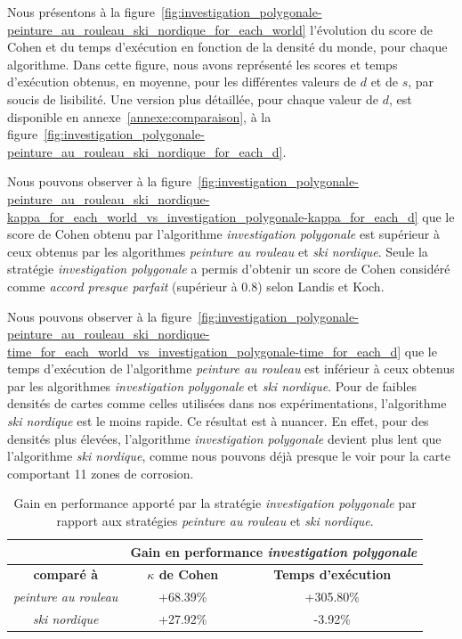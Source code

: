 \documentclass[francais,RandD]{rapportPFE}
\begin{document}
			Nous présentons à la figure~\ref{fig:investigation_polygonale-peinture_au_rouleau_ski_nordique_for_each_world} l'évolution du score de Cohen et du temps d'exécution en fonction de la densité du monde, pour chaque algorithme.
			Dans cette figure, nous avons représenté les scores et temps d'exécution obtenus, en moyenne, pour les différentes valeurs de $d$ et de $s$, par soucis de lisibilité.
			Une version plus détaillée, pour chaque valeur de $d$, est disponible en annexe~\ref{annexe:comparaison}, à la figure~\ref{fig:investigation_polygonale-peinture_au_rouleau_ski_nordique_for_each_d}.

			Nous pouvons observer à la figure~\ref{fig:investigation_polygonale-peinture_au_rouleau_ski_nordique-kappa_for_each_world_vs_investigation_polygonale-kappa_for_each_d} que le score de Cohen obtenu par l'algorithme \textit{investigation polygonale} est supérieur à ceux obtenus par les algorithmes \textit{peinture au rouleau} et \textit{ski nordique}.
			Seule la stratégie \textit{investigation polygonale} a permis d'obtenir un score de Cohen considéré comme \textit{accord presque parfait} (supérieur à 0.8) selon Landis et Koch.

			Nous pouvons observer à la figure~\ref{fig:investigation_polygonale-peinture_au_rouleau_ski_nordique-time_for_each_world_vs_investigation_polygonale-time_for_each_d} que le temps d'exécution de l'algorithme \textit{peinture au rouleau} est inférieur à ceux obtenus par les algorithmes \textit{investigation polygonale} et \textit{ski nordique}.
			Pour de faibles densités de cartes comme celles utilisées dans nos expérimentations, l'algorithme \textit{ski nordique} est le moins rapide.
			Ce résultat est à nuancer.
			En effet, pour des densités plus élevées, l'algorithme \textit{investigation polygonale} devient plus lent que l'algorithme \textit{ski nordique}, comme nous pouvons déjà presque le voir pour la carte comportant 11 zones de corrosion.

			\begin{table}[h!]
				\centering
				\begin{tabular}{|c|c|c|}
					\hline
					& \multicolumn{2}{c|}{\textbf{Gain en performance \textit{investigation polygonale}}} \\
					\hline
					\textbf{comparé à} & \textbf{$\kappa$ de Cohen} & \textbf{Temps d'exécution} \\
					\hline
					\textit{peinture au rouleau} & +68.39\% & +305.80\% \\
					\hline
					\textit{ski nordique} & +27.92\% & -3.92\% \\
					\hline
				\end{tabular}
				\caption{Gain en performance apporté par la stratégie \textit{investigation polygonale} par rapport aux stratégies \textit{peinture au rouleau} et \textit{ski nordique}.}
				\label{tab:gain}
			\end{table}
\end{document}
